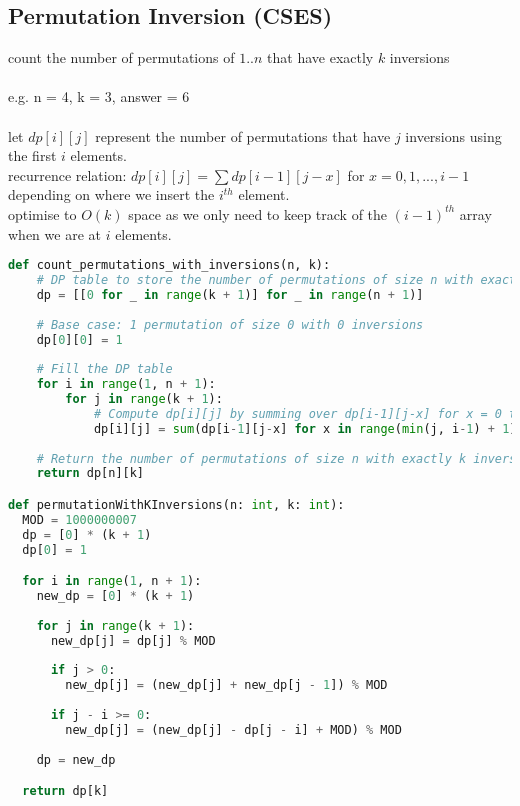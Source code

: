 \documentclass[11pt]{article}
\begin{document}
\subsection{Permutation Inversion (CSES)}
count the number of permutations of $1..n$ that have exactly $k$ inversions\\\;\\
e.g. n = 4, k = 3, answer = 6\\\;\\
let $dp[i][j]$ represent the number of permutations that have $j$ inversions using the first $i$ elements.\\
recurrence relation: $dp[i][j] = \sum dp[i-1][j-x]$ for $x = 0, 1, ... , i-1$ depending on where we insert the $i^{th}$ element.\\
optimise to $O(k)$ space as we only need to keep track of the $(i-1)^{th}$ array when we are at $i$ elements.

\begin{lstlisting}[language=Python]
def count_permutations_with_inversions(n, k):
    # DP table to store the number of permutations of size n with exactly k inversions
    dp = [[0 for _ in range(k + 1)] for _ in range(n + 1)]
    
    # Base case: 1 permutation of size 0 with 0 inversions
    dp[0][0] = 1
    
    # Fill the DP table
    for i in range(1, n + 1):
        for j in range(k + 1):
            # Compute dp[i][j] by summing over dp[i-1][j-x] for x = 0 to min(j, i-1)
            dp[i][j] = sum(dp[i-1][j-x] for x in range(min(j, i-1) + 1))
    
    # Return the number of permutations of size n with exactly k inversions
    return dp[n][k]

def permutationWithKInversions(n: int, k: int):
  MOD = 1000000007
  dp = [0] * (k + 1)
  dp[0] = 1

  for i in range(1, n + 1):
    new_dp = [0] * (k + 1)
    
    for j in range(k + 1):
      new_dp[j] = dp[j] % MOD
      
      if j > 0:
        new_dp[j] = (new_dp[j] + new_dp[j - 1]) % MOD
        
      if j - i >= 0:
        new_dp[j] = (new_dp[j] - dp[j - i] + MOD) % MOD
        
    dp = new_dp

  return dp[k]

\end{lstlisting}
\end{document}
